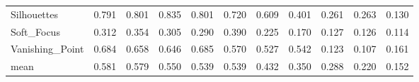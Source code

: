 \begin{tabular}{lllllrlllll}
Silhouettes          &                 0.791 &   0.801 &              0.835 &  0.801 &             0.720 &   0.609 &           0.401 &            0.261 & 0.263 &                0.130 \\
Soft\_Focus           &                 0.312 &   0.354 &              0.305 &  0.290 &             0.390 &   0.225 &           0.170 &            0.127 & 0.126 &                0.114 \\
Vanishing\_Point      &                 0.684 &   0.658 &              0.646 &  0.685 &             0.570 &   0.527 &           0.542 &            0.123 & 0.107 &                0.161 \\
\midrule
mean                &                 0.581 &   0.579 &              0.550 &  0.539 &             0.539 &   0.432 &           0.350 &            0.288 & 0.220 &                0.152 \\
\bottomrule
\end{tabular}
